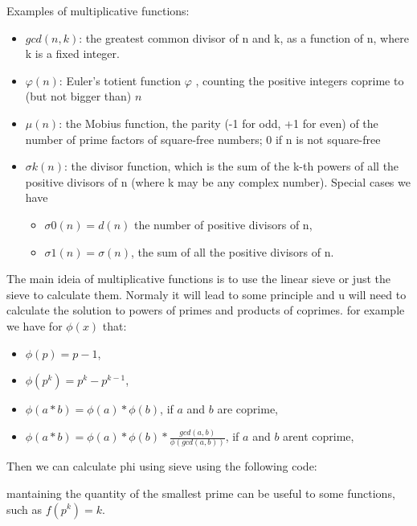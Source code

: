             Examples of multiplicative functions:
            \begin{itemize}
                \item $gcd(n,k)$: the greatest common divisor of n and k, as a function of n, where k is a fixed integer.
        \item {$\displaystyle \varphi (n)$}: Euler's totient function 
        {$\displaystyle \varphi$ }, counting the positive integers coprime to (but not bigger than) $n$
        \item $\mu (n)$: the Mobius function, the parity (-1 for odd, +1 for even) of the number of prime factors of square-free numbers; 0 if n is not square-free
        \item $\sigma k(n)$: the divisor function, which is the sum of the k-th powers of all the positive divisors of n (where k may be any complex number). Special cases we have
        \begin{itemize}
            \item $\sigma 0(n) = d(n)$ the number of positive divisors of n,
            \item $\sigma 1(n) = \sigma (n)$, the sum of all the positive divisors of n.
        \end{itemize}
            \end{itemize}

            The main ideia of multiplicative functions is to use the linear sieve or just the sieve to calculate them. Normaly it will lead to some principle and u will need to calculate the solution to powers of primes and products of coprimes.
            for example we have for $\phi(x)$ that:
            \begin{itemize}
                \item $\phi(p) = p-1$,
                \item $\phi(p^k) = p^k -p^{k-1}$,
                \item $\phi(a*b) = \phi(a) * \phi(b)$, if $a$ and $b$ are coprime,
                \item $\phi(a*b) = \phi(a) * \phi(b) * \frac{gcd(a,b)}{\phi(gcd(a,b))}$, if $a$ and $b$ arent coprime,
            \end{itemize}

            Then we can calculate phi using sieve using the following code:

            

            mantaining the quantity of the smallest prime can be useful to some functions, such as $f(p^k) = k$.

